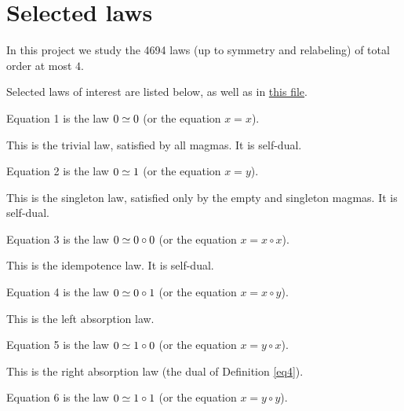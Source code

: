 \chapter{Selected laws}\label{subgraph-eq}

In this project we study the 4694 laws (up to symmetry and relabeling) of total order at most $4$.

Selected laws of interest are listed below, as well as in \href{https://github.com/teorth/equational_theories/blob/main/equational_theories/Equations.lean}{this file}.

\begin{definition}[Equation 1]\label{eq1}\leanok{}  Equation 1 is the law $0 \simeq 0$ (or the equation $x=x$).
\end{definition}

This is the trivial law, satisfied by all magmas. It is self-dual.


\begin{definition}[Equation 2]\label{eq2}\leanok{}  Equation 2 is the law $0 \simeq 1$ (or the equation $x=y$).
\end{definition}

This is the singleton law, satisfied only by the empty and singleton magmas.  It is self-dual.

\begin{definition}[Equation 3]\label{eq3}\leanok{}  Equation 3 is the law $0 \simeq 0 \circ 0$ (or the equation $x = x \circ x$).
\end{definition}

This is the idempotence law.  It is self-dual.

\begin{definition}[Equation 4]\label{eq4}\leanok{}  Equation 4 is the law $0 \simeq 0 \circ 1$ (or the equation $x = x \circ y$).
\end{definition}

This is the left absorption law.

\begin{definition}[Equation 5]\label{eq5}\leanok{}  Equation 5 is the law $0 \simeq 1 \circ 0$ (or the equation $x = y \circ x$).
\end{definition}

This is the right absorption law (the dual of Definition \ref{eq4}).

\begin{definition}[Equation 6]\label{eq6}\leanok{}  Equation 6 is the law $0 \simeq 1 \circ 1$ (or the equation $x = y \circ y$).
\end{definition}

